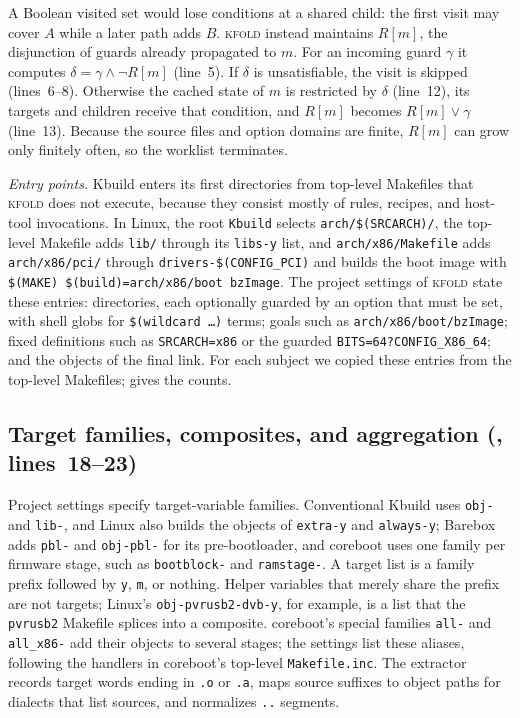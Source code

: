 \documentclass[acmsmall,screen,review]{acmart}
\newcommand{\tool}{\textsc{kfold}\xspace}
\begin{document}
A Boolean visited set would lose conditions at a shared child: the first visit may cover $A$ while a later path adds $B$. \tool instead maintains $R[m]$, the disjunction of guards already propagated to $m$. For an incoming guard $\gamma$ it computes $\delta=\gamma\land\neg R[m]$ (line~5). If $\delta$ is unsatisfiable, the visit is skipped (lines~6--8). Otherwise the cached state of $m$ is restricted by $\delta$ (line~12), its targets and children receive that condition, and $R[m]$ becomes $R[m]\lor\gamma$ (line~13). Because the source files and option domains are finite, $R[m]$ can grow only finitely often, so the worklist terminates.

\emph{Entry points.} Kbuild enters its first directories from top-level Makefiles that \tool does not execute, because they consist mostly of rules, recipes, and host-tool invocations. In Linux, the root \texttt{Kbuild} selects \texttt{arch/\$(SRCARCH)/}, the top-level Makefile adds \texttt{lib/} through its \texttt{libs-y} list, and \texttt{arch/x86/Makefile} adds \texttt{arch/x86/pci/} through \texttt{drivers-\$(CONFIG\_PCI)} and builds the boot image with \texttt{\$(MAKE) \$(build)=arch/x86/boot bzImage}. The project settings of \tool state these entries: directories, each optionally guarded by an option that must be set, with shell globs for \texttt{\$(wildcard \ldots)} terms; goals such as \texttt{arch/x86/boot/bzImage}; fixed definitions such as \texttt{SRCARCH=x86} or the guarded \texttt{BITS=64?CONFIG\_X86\_64}; and the objects of the final link. For each subject we copied these entries from the top-level Makefiles;  gives the counts.

\subsection{Target families, composites, and aggregation (, lines~18--23)}
\label{sec:design:targets}
Project settings specify target-variable families. Conventional Kbuild uses \texttt{obj-} and \texttt{lib-}, and Linux also builds the objects of \texttt{extra-y} and \texttt{always-y}; Barebox adds \texttt{pbl-} and \texttt{obj-pbl-} for its pre-bootloader, and coreboot uses one family per firmware stage, such as \texttt{bootblock-} and \texttt{ramstage-}. A target list is a family prefix followed by \texttt{y}, \texttt{m}, or nothing. Helper variables that merely share the prefix are not targets; Linux's \texttt{obj-pvrusb2-dvb-y}, for example, is a list that the \texttt{pvrusb2} Makefile splices into a composite. coreboot's special families \texttt{all-} and \texttt{all\_x86-} add their objects to several stages; the settings list these aliases, following the handlers in coreboot's top-level \texttt{Makefile.inc}. The extractor records target words ending in \texttt{.o} or \texttt{.a}, maps source suffixes to object paths for dialects that list sources, and normalizes \texttt{..} segments.
\end{document}
